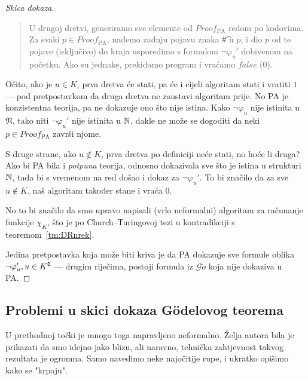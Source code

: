 \begin{proof}[Skica dokaza]
\begin{quote}
    U drugoj dretvi, generiramo sve elemente od $Proof_{\text{PA}}$ redom po kodovima. Za svaki $p\in Proof_{\text{PA}}$, nađemo zadnju pojavu znaka \t\# u $p$, i dio $p$ od te pojave (isključivo) do kraja usporedimo s formulom $\neg\varphi_u'$ dobivenom na početku. Ako su jednake, prekidamo program i vraćamo $\mathit{false}$ ($0$).
\end{quote}

Očito, ako je $u\in K$, prva dretva će stati, pa će i cijeli algoritam stati i vratiti $1$ --- pod pretpostavkom da druga dretva ne zaustavi algoritam prije. No PA je konzistentna teorija, pa ne dokazuje ono što nije istina. Kako $\neg\varphi_u$ nije istinita u $\mathfrak N$, tako niti $\neg\varphi_u'$ nije istinita u ${\mathbb N}$, dakle ne može se dogoditi da neki $p\in Proof_{\text{PA}}$ završi njome.

S druge strane, ako $u\notin K$, prva dretva po definiciji neće stati, no hoće li druga? Ako bi PA bila i \emph{potpuna} teorija, odnosno dokazivala sve što je istina u strukturi ${\mathbb N}$, tada bi s vremenom na red došao i dokaz za $\neg\varphi_u'$. To bi značilo da za sve $u\notin K$, naš algoritam također stane i vraća $0$.

No to bi značilo da smo upravo napisali (vrlo neformalni) algoritam za računanje funkcije $\chi_{K}$, što je po Church--\!Turingovoj tezi u kontradikciji s teoremom~\ref{tm:DRnrek}.

Jedina pretpostavka koja može biti kriva je da PA dokazuje sve formule oblika $\neg\varphi_u', u\in K\sp{{\scriptscriptstyle\complement}}$ --- drugim riječima, postoji formula iz $\mathscr G\ddot o$ koja nije dokaziva u PA.
\end{proof}

\subsection{Problemi u skici dokaza G\"odelovog teorema}

U prethodnoj točki je mnogo toga napravljeno neformalno. Želja autora bila je prikazati da smo idejno jako blizu, ali naravno, tehnička zahtjevnost takvog rezultata je ogromna. Samo navedimo neke najočitije rupe, i ukratko opišimo kako se "krpaju".

